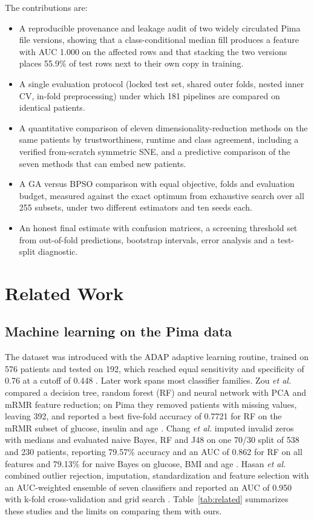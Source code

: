 \documentclass[conference]{IEEEtran}
\begin{document}
The contributions are:
\begin{itemize}
\item A reproducible provenance and leakage audit of two widely circulated Pima file versions, showing that a class-conditional median fill produces a feature with AUC 1.000 on the affected rows and that stacking the two versions places 55.9\% of test rows next to their own copy in training.
\item A single evaluation protocol (locked test set, shared outer folds, nested inner CV, in-fold preprocessing) under which 181 pipelines are compared on identical patients.
\item A quantitative comparison of eleven dimensionality-reduction methods on the same patients by trustworthiness, runtime and class agreement, including a verified from-scratch symmetric SNE, and a predictive comparison of the seven methods that can embed new patients.
\item A GA versus BPSO comparison with equal objective, folds and evaluation budget, measured against the exact optimum from exhaustive search over all 255 subsets, under two different estimators and ten seeds each.
\item An honest final estimate with confusion matrices, a screening threshold set from out-of-fold predictions, bootstrap intervals, error analysis and a test-split diagnostic.
\end{itemize}

\section{Related Work}
\label{sec:related}

\subsection{Machine learning on the Pima data}
The dataset was introduced with the ADAP adaptive learning routine, trained on 576 patients and tested on 192, which reached equal sensitivity and specificity of 0.76 at a cutoff of 0.448 \cite{smith1988,uci_pima}. Later work spans most classifier families. Zou \textit{et al.} compared a decision tree, random forest (RF) and neural network with PCA and mRMR feature reduction; on Pima they removed patients with missing values, leaving 392, and reported a best five-fold accuracy of 0.7721 for RF on the mRMR subset of glucose, insulin and age \cite{zou2018}. Chang \textit{et al.} imputed invalid zeros with medians and evaluated naive Bayes, RF and J48 on one 70/30 split of 538 and 230 patients, reporting 79.57\% accuracy and an AUC of 0.862 for RF on all features and 79.13\% for naive Bayes on glucose, BMI and age \cite{chang2022}. Hasan \textit{et al.} combined outlier rejection, imputation, standardization and feature selection with an AUC-weighted ensemble of seven classifiers and reported an AUC of 0.950 with k-fold cross-validation and grid search \cite{hasan2020}. Table~\ref{tab:related} summarizes these studies and the limits on comparing them with ours.
\end{document}
